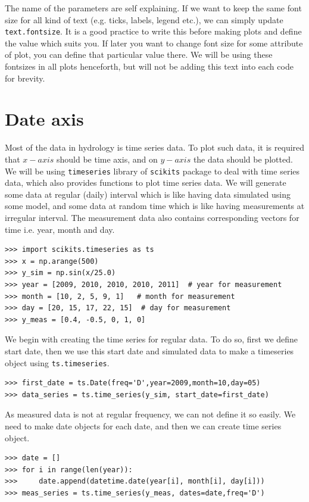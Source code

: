 \documentclass[10pt]{book}
\begin{document}
{The name of the parameters are self explaining. If we want to keep the same font size for all kind of text (e.g. ticks, labels, legend etc.), we can simply update \verb"text.fontsize". It is a good practice to write this before making plots and define the value which suits you. If later you want to change font size for some attribute of plot, you can define that particular value there. We will be using these fontsizes in all plots henceforth, but will not be adding this text into each code for brevity. \\

\section{Date axis}
Most of the data in hydrology is time series data. To plot such data, it is required that $x-axis$ should be time axis, and on $y-axis$ the data should be plotted. We will be using \verb"timeseries" library of \verb"scikits" package to deal with time series data, which also provides functions to plot time series data. We will generate some data at regular (daily) interval which is like having data simulated using some model, and some data at random time which is like having measurements at irregular interval. The measurement data also contains corresponding vectors for time i.e. year, month and day.

\beforeverb \begin{verbatim}
>>> import scikits.timeseries as ts
>>> x = np.arange(500)
>>> y_sim = np.sin(x/25.0)
>>> year = [2009, 2010, 2010, 2010, 2011]  # year for measurement
>>> month = [10, 2, 5, 9, 1]   # month for measurement
>>> day = [20, 15, 17, 22, 15]  # day for measurement
>>> y_meas = [0.4, -0.5, 0, 1, 0]
\end{verbatim} \afterverb

We begin with creating the time series for regular data. To do so, first we define start date, then we use this start date and simulated data to make a timeseries object using \verb"ts.timeseries". 
\beforeverb \begin{verbatim}
>>> first_date = ts.Date(freq='D',year=2009,month=10,day=05)
>>> data_series = ts.time_series(y_sim, start_date=first_date)
\end{verbatim} \afterverb
As measured data is not at regular frequency, we can not define it so easily. We need to make date objects for each date, and then we can create time series object. 

\beforeverb \begin{verbatim}
>>> date = []
>>> for i in range(len(year)):
>>>     date.append(datetime.date(year[i], month[i], day[i]))
>>> meas_series = ts.time_series(y_meas, dates=date,freq='D')
\end{verbatim} \afterverb

}
\end{document}
